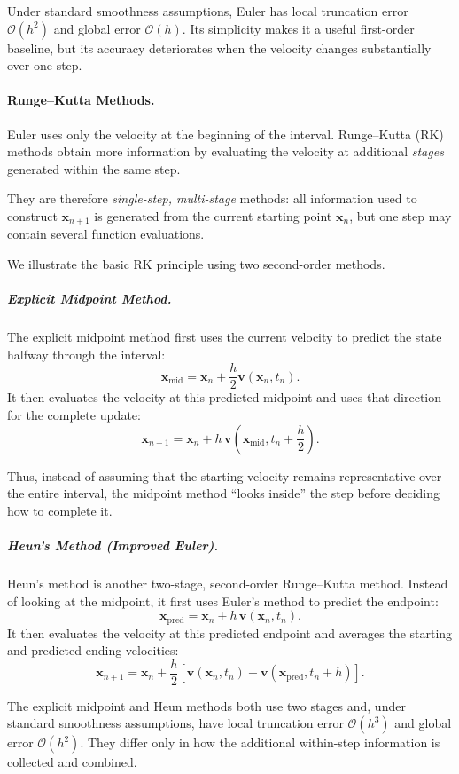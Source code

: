 Under standard smoothness assumptions, Euler has local truncation error
$\mathcal O(h^2)$ and global error $\mathcal O(h)$. Its simplicity makes it
a useful first-order baseline, but its accuracy deteriorates when the
velocity changes substantially over one step.


\paragraph{Runge--Kutta Methods.}
Euler uses only the velocity at the beginning of the interval. Runge--Kutta
(RK) methods obtain more information by evaluating the velocity at additional
\emph{stages} generated within the same step.

They are therefore \emph{single-step, multi-stage} methods: all information
used to construct $\mathbf{x}_{n+1}$ is generated from the current starting
point $\mathbf{x}_n$, but one step may contain several function evaluations.

We illustrate the basic RK principle using two second-order methods.

\subparagraph{Explicit Midpoint Method.}
The explicit midpoint method first uses the current velocity to predict the
state halfway through the interval:
\[
\mathbf{x}_{\mathrm{mid}}
=
\mathbf{x}_n
+
\frac{h}{2}
\mathbf{v}(\mathbf{x}_n,t_n).
\]
It then evaluates the velocity at this predicted midpoint and uses that
direction for the complete update:
\[
\mathbf{x}_{n+1}
=
\mathbf{x}_n
+
h\,
\mathbf{v}
\left(
\mathbf{x}_{\mathrm{mid}},
t_n+\frac{h}{2}
\right).
\]

Thus, instead of assuming that the starting velocity remains representative
over the entire interval, the midpoint method ``looks inside'' the step
before deciding how to complete it.


\subparagraph{Heun's Method (Improved Euler).}
Heun's method is another two-stage, second-order Runge--Kutta method.
Instead of looking at the midpoint, it first uses Euler's method to predict
the endpoint:
\[
\mathbf{x}_{\mathrm{pred}}
=
\mathbf{x}_n
+
h\,\mathbf{v}(\mathbf{x}_n,t_n).
\]
It then evaluates the velocity at this predicted endpoint and averages the
starting and predicted ending velocities:
\[
\mathbf{x}_{n+1}
=
\mathbf{x}_n
+
\frac{h}{2}
\left[
\mathbf{v}(\mathbf{x}_n,t_n)
+
\mathbf{v}(\mathbf{x}_{\mathrm{pred}},t_n+h)
\right].
\]

The explicit midpoint and Heun methods both use two stages and, under
standard smoothness assumptions, have local truncation error
$\mathcal O(h^3)$ and global error $\mathcal O(h^2)$. They differ only in
how the additional within-step information is collected and combined.


